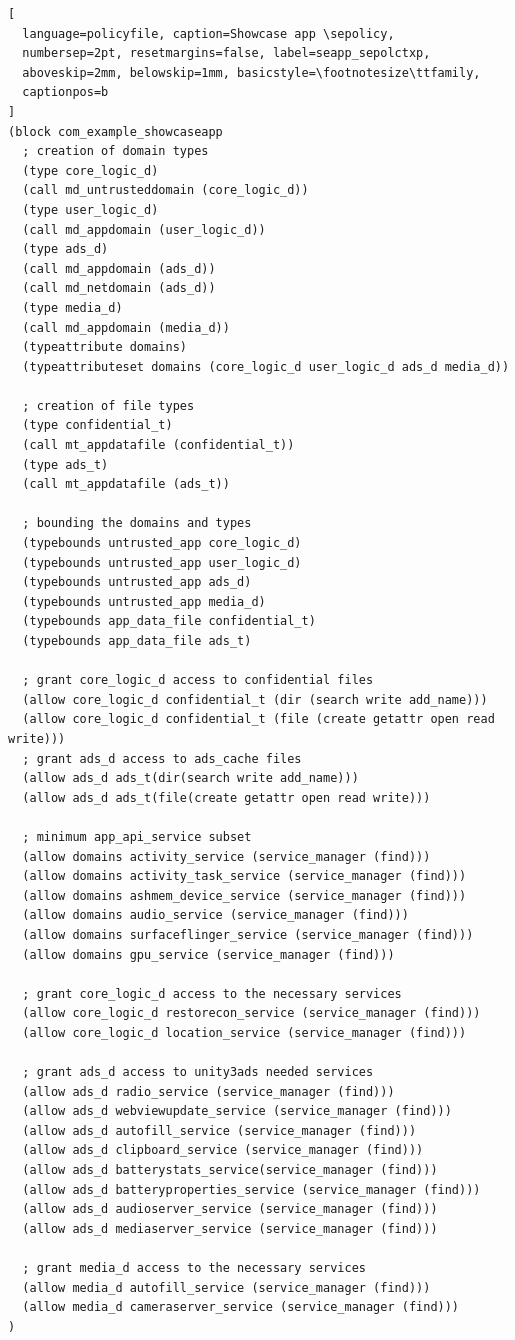 \begin{lstlisting}[
  language=policyfile, caption=Showcase app \sepolicy,
  numbersep=2pt, resetmargins=false, label=seapp_sepolctxp,
  aboveskip=2mm, belowskip=1mm, basicstyle=\footnotesize\ttfamily,
  captionpos=b
]
(block com_example_showcaseapp
  ; creation of domain types
  (type core_logic_d)
  (call md_untrusteddomain (core_logic_d))
  (type user_logic_d)
  (call md_appdomain (user_logic_d))
  (type ads_d)
  (call md_appdomain (ads_d))
  (call md_netdomain (ads_d))
  (type media_d)
  (call md_appdomain (media_d))
  (typeattribute domains)
  (typeattributeset domains (core_logic_d user_logic_d ads_d media_d))

  ; creation of file types
  (type confidential_t)
  (call mt_appdatafile (confidential_t))
  (type ads_t)
  (call mt_appdatafile (ads_t))

  ; bounding the domains and types
  (typebounds untrusted_app core_logic_d)
  (typebounds untrusted_app user_logic_d)
  (typebounds untrusted_app ads_d)
  (typebounds untrusted_app media_d)	
  (typebounds app_data_file confidential_t)
  (typebounds app_data_file ads_t)

  ; grant core_logic_d access to confidential files
  (allow core_logic_d confidential_t (dir (search write add_name)))
  (allow core_logic_d confidential_t (file (create getattr open read write)))
  ; grant ads_d access to ads_cache files
  (allow ads_d ads_t(dir(search write add_name)))
  (allow ads_d ads_t(file(create getattr open read write)))

  ; minimum app_api_service subset
  (allow domains activity_service (service_manager (find)))
  (allow domains activity_task_service (service_manager (find)))
  (allow domains ashmem_device_service (service_manager (find)))
  (allow domains audio_service (service_manager (find)))
  (allow domains surfaceflinger_service (service_manager (find)))
  (allow domains gpu_service (service_manager (find)))

  ; grant core_logic_d access to the necessary services
  (allow core_logic_d restorecon_service (service_manager (find)))
  (allow core_logic_d location_service (service_manager (find)))

  ; grant ads_d access to unity3ads needed services
  (allow ads_d radio_service (service_manager (find)))
  (allow ads_d webviewupdate_service (service_manager (find)))
  (allow ads_d autofill_service (service_manager (find)))
  (allow ads_d clipboard_service (service_manager (find)))
  (allow ads_d batterystats_service(service_manager (find)))
  (allow ads_d batteryproperties_service (service_manager (find)))
  (allow ads_d audioserver_service (service_manager (find)))
  (allow ads_d mediaserver_service (service_manager (find)))

  ; grant media_d access to the necessary services
  (allow media_d autofill_service (service_manager (find)))
  (allow media_d cameraserver_service (service_manager (find)))
)
\end{lstlisting}


